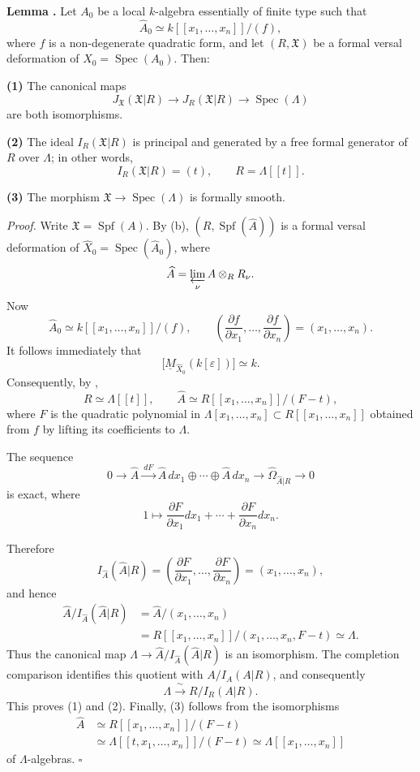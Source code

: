 \par\medskip
\noindent\textbf{Lemma .}
Let $A_0$ be a local $k$-algebra essentially of finite type such that
\[
\widehat A_0\simeq k[[x_1,\ldots,x_n]]/(f),
\]
where $f$ is a non-degenerate quadratic form, and let
$(R,\mathfrak X)$ be a formal versal deformation of
$X_0=\operatorname{Spec}(A_0)$. Then:

\smallskip
\noindent\textbf{(1)} The canonical maps
\[
J_{\mathfrak X}(\mathfrak X|R)
 \longrightarrow J_R(\mathfrak X|R)
 \longrightarrow \operatorname{Spec}(\Lambda)
\]
are both isomorphisms.

\smallskip
\noindent\textbf{(2)} The ideal
$I_R(\mathfrak X|R)$ is principal and generated by a free formal
generator of $R$ over $\Lambda$; in other words,
\[
I_R(\mathfrak X|R)=(t),
\qquad R=\Lambda[[t]].
\]

\smallskip
\noindent\textbf{(3)} The morphism
$\mathfrak X\longrightarrow\operatorname{Spec}(\Lambda)$ is formally
smooth.

\smallskip
\noindent\textit{Proof.}
Write $\mathfrak X=\operatorname{Spf}(A)$. By (b),
$(R,\operatorname{Spf}(\widehat A))$ is a formal versal deformation
of $\widehat X_0=\operatorname{Spec}(\widehat A_0)$, where
\[
\widehat A=\varprojlim_\nu A\otimes_RR_\nu.
\]
Now
\[
\widehat A_0\simeq k[[x_1,\ldots,x_n]]/(f),
\qquad
\left(\frac{\partial f}{\partial x_1},\ldots,
      \frac{\partial f}{\partial x_n}\right)
=(x_1,\ldots,x_n).
\]
It follows immediately that
\[
\bigl[\underline M_{\widehat X_0}(k[\varepsilon])\bigr]
\simeq k.
\]
Consequently, by ,
\[
R\simeq\Lambda[[t]],
\qquad
\widehat A\simeq R[[x_1,\ldots,x_n]]/(F-t),
\]
where $F$ is the quadratic polynomial in
$\Lambda[x_1,\ldots,x_n]\subset R[[x_1,\ldots,x_n]]$ obtained from
$f$ by lifting its coefficients to $\Lambda$.

The sequence
\[
0\longrightarrow\widehat A
 \xrightarrow{\ dF\ }
 \widehat A\,dx_1\oplus\cdots\oplus\widehat A\,dx_n
 \longrightarrow\widehat\Omega_{\widehat A|R}\longrightarrow0
\]
is exact, where
\[
1\longmapsto
 \frac{\partial F}{\partial x_1}dx_1+\cdots+
 \frac{\partial F}{\partial x_n}dx_n.
\]


Therefore
\[
I_{\widehat A}(\widehat A|R)
=\left(\frac{\partial F}{\partial x_1},\ldots,
       \frac{\partial F}{\partial x_n}\right)
=(x_1,\ldots,x_n),
\]
and hence
\[
\begin{aligned}
\widehat A/I_{\widehat A}(\widehat A|R)
&=\widehat A/(x_1,\ldots,x_n)\\
&=R[[x_1,\ldots,x_n]]/(x_1,\ldots,x_n,F-t)
 \simeq\Lambda.
\end{aligned}
\]
Thus the canonical map
$\Lambda\longrightarrow
\widehat A/I_{\widehat A}(\widehat A|R)$ is an isomorphism. The
completion comparison identifies this quotient with
$A/I_A(A|R)$, and consequently
\[
\Lambda\xrightarrow{\ \sim\ }R/I_R(A|R).
\]
This proves (1) and (2). Finally, (3) follows from the isomorphisms
\[
\begin{aligned}
\widehat A
&\simeq R[[x_1,\ldots,x_n]]/(F-t)\\
&\simeq\Lambda[[t,x_1,\ldots,x_n]]/(F-t)
 \simeq\Lambda[[x_1,\ldots,x_n]]
\end{aligned}
\]
of $\Lambda$-algebras.
\hfill$\square$
